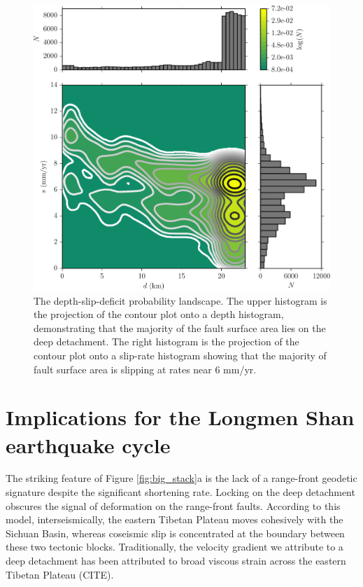 \documentclass[12pt]{article}
\begin{document}
\begin{figure}[h!]
    \centering
    \includegraphics{figs/depth_slip_contour.pdf}
    \caption{The depth-slip-deficit probability landscape. The upper histogram is the projection of the contour plot onto a depth histogram, demonstrating that the majority of the fault surface area lies on the deep detachment. The right histogram is the projection of the contour plot onto a slip-rate histogram showing that the majority of fault surface area is slipping at rates near 6 mm/yr.}
    \label{fig:distribution}
\end{figure}

\section{Implications for the Longmen Shan earthquake cycle}
The striking feature of Figure \ref{fig:big_stack}a is the lack of a range-front geodetic signature despite the significant shortening rate. Locking on the deep detachment obscures the signal of deformation on the range-front faults. According to this model, interseismically, the eastern Tibetan Plateau moves cohesively with the Sichuan Basin, whereas coseismic slip is concentrated at the boundary between these two tectonic blocks. Traditionally, the velocity gradient we attribute to a deep detachment has been attributed to broad viscous strain across the eastern Tibetan Plateau (CITE).
\end{document}
